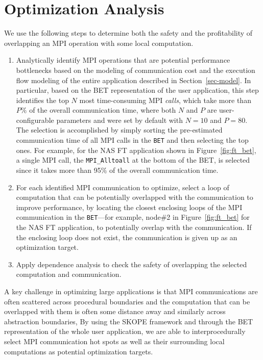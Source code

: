 \section{Optimization Analysis}
\label {sec-analysis}

We use the following steps to
determine both the safety and the profitability of overlapping an MPI operation with some local computation.

\begin{enumerate}
\item Analytically identify MPI operations that are potential performance bottlenecks based on the modeling of communication cost
    and the execution flow modeling of the entire application described in Section~\ref{sec-model}.
    In particular, based on the BET representation of the user application, this step identifies the top $N$ most time-consuming MPI \emph{calls}, which take more than $P\%$ of the overall communication time, where both $N$ and $P$ are user-configurable parameters and were set by default with $N=10$ and $P=80$.
The selection is accomplished by simply sorting the pre-estimated communication time of all MPI  calls in the \texttt{BET} and then selecting the top ones.
For example, for the NAS FT application shown in Figure~\ref{fig:ft_bet},
a single MPI call, the \texttt{MPI\_Alltoall} at the bottom of the BET, is selected since
 it takes more than 95\% of the overall communication time.
\item
  For each identified MPI communication to optimize, select a loop of computation that can be potentially overlapped with the communication to improve performance, by  locating the closest enclosing loops of the MPI communication in the \texttt{BET}---for example,
node\#2 in Figure~\ref{fig:ft_bet} for the NAS FT application, to potentially overlap with the communication.  If the enclosing loop does not exist, the communication is given up as an optimization target.
\item
Apply dependence analysis to check the safety of overlapping the selected computation and communication.
\end{enumerate}

A key challenge in optimizing large applications is that MPI communications are often scattered across procedural boundaries
and the computation that can be overlapped with them is often some distance away and similarly across abstraction boundaries,
By using the SKOPE framework and through the BET representation of the whole user application, we are able to interprocedurally select MPI communication hot spots as well as their surrounding local computations as potential optimization targets.

